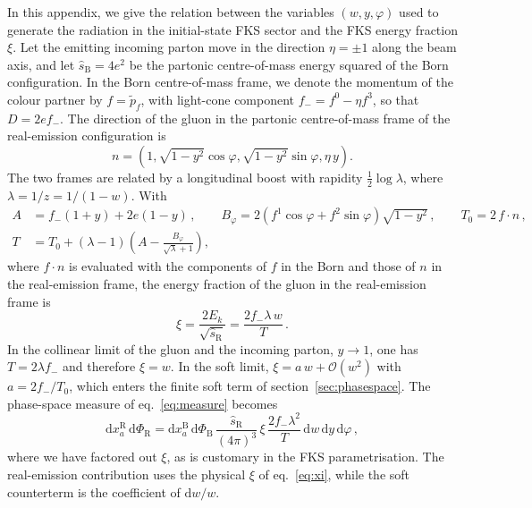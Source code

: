 \documentclass[a4paper,11pt]{article}
\newcommand{\dd}{\mathrm{d}}
\newcommand{\order}[1]{\mathcal{O}(#1)}
\newcommand{\PhiB}{\Phi_{\mathrm{B}}}
\newcommand{\PhiR}{\Phi_{\mathrm{R}}}
\begin{document}
In this appendix, we give the relation between the variables
$(w,y,\varphi)$ used to generate the radiation in the initial-state
FKS sector and the FKS energy fraction $\xi$. Let the emitting
incoming parton move in the direction $\eta=\pm1$ along the beam axis,
and let $\hat s_{\mathrm{B}}=4e^2$ be the partonic centre-of-mass
energy squared of the Born configuration. In the Born centre-of-mass
frame, we denote the momentum of the colour partner by $f=\tilde p_f$,
with light-cone component $f_-=f^0-\eta f^3$, so that $D=2ef_-$. The
direction of the gluon in the partonic centre-of-mass frame of the
real-emission configuration is
\begin{equation}
  n=\left(1,\sqrt{1-y^2}\cos\varphi,\sqrt{1-y^2}\sin\varphi,\eta\,y\right).
  \label{eq:gluondirection}
\end{equation}
The two frames are related by a longitudinal boost with rapidity
$\frac{1}{2}\log\lambda$, where $\lambda=1/z=1/(1-w)$. With
\begin{align}
  A&=f_-(1+y)+2e(1-y)\,,\qquad
  B_\varphi=2\left(f^1\cos\varphi+f^2\sin\varphi\right)\sqrt{1-y^2}\,,\qquad
  T_0=2\,f\cdot n\,,\nonumber\\
  T&=T_0+(\lambda-1)\left(A-\frac{B_\varphi}{\sqrt\lambda+1}\right),
  \label{eq:Tdef}
\end{align}
where $f\cdot n$ is evaluated with the components of $f$ in the Born
and those of $n$ in the real-emission frame, the energy fraction of
the gluon in the real-emission frame is
\begin{equation}
  \xi=\frac{2E_k}{\sqrt{\hat s_{\mathrm{R}}}}=\frac{2f_-\lambda\,w}{T}\,.
  \label{eq:xi}
\end{equation}
In the collinear limit of the gluon and the incoming parton, $y\to1$,
one has $T=2\lambda f_-$ and therefore $\xi=w$. In the soft limit,
$\xi=a\,w+\order{w^2}$ with $a=2f_-/T_0$, which enters the finite soft
term of section~\ref{sec:phasespace}. The phase-space measure of
eq.~\eqref{eq:measure} becomes
\begin{equation}
  \dd x_a^{\mathrm{R}}\,\dd\PhiR=\dd x_a^{\mathrm{B}}\,\dd\PhiB\,
  \frac{\hat s_{\mathrm{R}}}{(4\pi)^3}\,\xi\,\frac{2f_-\lambda^2}{T}\,
  \dd w\,\dd y\,\dd\varphi\,,
  \label{eq:measurexi}
\end{equation}
where we have factored out $\xi$, as is customary in the FKS
parametrisation. The real-emission contribution uses the physical
$\xi$ of eq.~\eqref{eq:xi}, while the soft counterterm is the
coefficient of $\dd w/w$.
\end{document}
